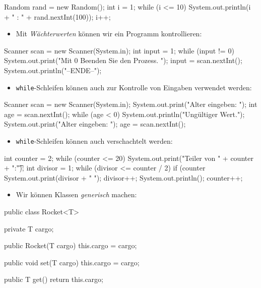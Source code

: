 \documentclass[a4paper,10pt, dvipsnames]{report}
\begin{document}
\begin{javacodebox}
    Random rand = new Random();
    int i = 1;
    while (i <= 10) {
        System.out.println(i + " : " + rand.nextInt(100));
        i++;
    }
\end{javacodebox}

\begin{itemize}
    \item Mit \textit{Wächterwerten} können wir ein Programm kontrollieren:
\end{itemize}

\begin{javacodebox}
Scanner scan = new Scanner(System.in);
int input = 1;
while (input != 0) {
    System.out.print("Mit 0 Beenden Sie den Prozess. ");
    input = scan.nextInt();
}
System.out.println("--ENDE--");
\end{javacodebox}

\begin{itemize}
    \item \texttt{while}-Schleifen können auch zur Kontrolle von Eingaben verwendet werden:
\end{itemize}

\begin{javacodebox}
Scanner scan = new Scanner(System.in);
System.out.print("Alter eingeben: ");
int age = scan.nextInt();
while (age < 0) {
    System.out.println("Ungültiger Wert.");
    System.out.print("Alter eingeben: ");
    age = scan.nextInt();
}
\end{javacodebox}

\begin{itemize}
    \item \texttt{while}-Schleifen können auch verschachtelt werden:
\end{itemize}

\begin{javacodebox}
int counter = 2;
while (counter <= 20) {
    System.out.print("Teiler von " + counter + ":\t");
    int divisor = 1;
    while (divisor <= counter / 2) {
        if (counter %
            System.out.print(divisor + " ");
        divisor++;
    }
    System.out.println();
    counter++;
}
\end{javacodebox}

\begin{itemize}
    \item Wir können Klassen \textit{generisch} machen:
\end{itemize}

\begin{javacodebox}
public class Rocket<T> {

    private T cargo;

    public Rocket(T cargo) {
    this.cargo = cargo;
    }

    public void set(T cargo) {
    this.cargo = cargo;
    }

    public T get() {
    return this.cargo;
    }
}
\end{javacodebox}
\end{document}
